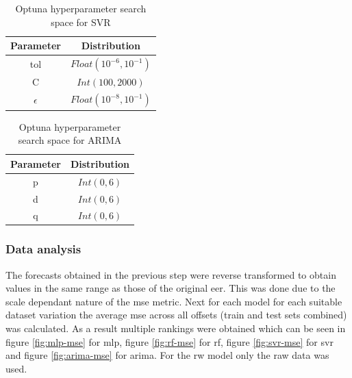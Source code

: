 \begin{table}[h]
    \centering
    \caption{Optuna hyperparameter search space for SVR}
    \begin{tabular}{|c|c|}
        \hline
        \textbf{Parameter} & \textbf{Distribution} \\
        \hline
        \hline
        tol & $Float(10^{-6}, 10^{-1})$ \\
        \hline
        C & $Int(100, 2000)$ \\
        \hline
        $\epsilon$ & $Float(10^{-8}, 10^{-1})$ \\
        \hline
    \end{tabular}
    \label{tab:svr-hyperparams}
\end{table}

\begin{table}[h]
    \centering
    \caption{Optuna hyperparameter search space for ARIMA}
    \begin{tabular}{|c|c|}
        \hline
        \textbf{Parameter} & \textbf{Distribution} \\
        \hline
        \hline
        p & $Int(0, 6)$ \\
        \hline
        d & $Int(0, 6)$ \\
        \hline
        q & $Int(0, 6)$ \\
        \hline
    \end{tabular}
    \label{tab:arima-hyperparams}
\end{table}

\subsubsection{Data analysis}\label{Data analysis}

The forecasts obtained in the previous step were reverse transformed to obtain values in the same range as those of the original \gls{eer}. This was done due to the scale dependant nature of the \gls{mse} metric. Next for each model for each suitable dataset variation the average \gls{mse} across all offsets (train and test sets combined) was calculated. As a result multiple rankings were obtained which can be seen in figure \ref{fig:mlp-mse} for \gls{mlp}, figure \ref{fig:rf-mse} for \gls{rf}, figure \ref{fig:svr-mse} for \gls{svr} and figure \ref{fig:arima-mse} for \gls{arima}. For the \gls{rw} model only the raw data was used.


